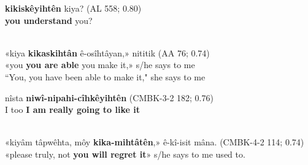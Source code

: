     \begin{exe}
    \ex 
    \gll \textbf{kikiskêyihtên} kiya? \tiny{(AL 558; 0.80)} \\
         {\textbf{you understand}} you? \\
    \trans  \\
    \label{vti-ivc2}
    \end{exe}
    
    \begin{exe}
    \ex 
    \gll «kiya \textbf{kikaskihtân} ê-osîhtâyan,» nititik \tiny{(AA 76; 0.74)} \\
         «you \textbf{{you are able}} {you make it},» {s/he says to me}\\
    \trans ``You, you have been able to make it," she says to me \tiny{\citep[68-69]{AhenakewAlice2000}} \\
    \label{vti-ivc3}
    \end{exe}

    \begin{exe}
    \ex 
    \gll nîsta \textbf{niwî-nipahi-cîhkêyihtên} \tiny{(CMBK-3-2 182; 0.76)} \\
         {I too} {\textbf{I am really going to like it}} \\
    \trans  \\
    \label{vti-ivc4}
    \end{exe}
    
    \begin{exe}
    \ex 
    \gll «kiyâm tâpwêhta, môy \textbf{kika-mihtâtên},» ê-kî-isit mâna. \tiny{(CMBK-4-2 114; 0.74)} \\
         «please truly, not {\textbf{you will regret it}}» {s/he says to me} {used to}. \\
    \trans  \\
    \label{vti-ivc5}
    \end{exe}
    
